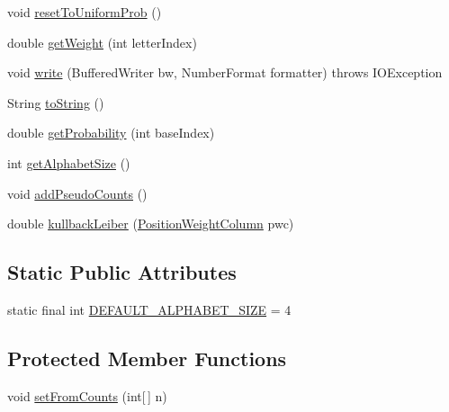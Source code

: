 \begin{DoxyCompactItemize}
void \hyperlink{classbroad_1_1core_1_1motif_1_1_position_weight_column_a526ed9055573827b2ccff975140a362f}{reset\+To\+Uniform\+Prob} ()
\item 
double \hyperlink{classbroad_1_1core_1_1motif_1_1_position_weight_column_a11cdf460bc71b967f82f8beff5425ee1}{get\+Weight} (int letter\+Index)
\item 
void \hyperlink{classbroad_1_1core_1_1motif_1_1_position_weight_column_ab4c32a7c518a414824ead8566a550762}{write} (Buffered\+Writer bw, Number\+Format formatter)  throws I\+O\+Exception 
\item 
String \hyperlink{classbroad_1_1core_1_1motif_1_1_position_weight_column_a5fd84a54189f40058feb2c570a427fd9}{to\+String} ()
\item 
double \hyperlink{classbroad_1_1core_1_1motif_1_1_position_weight_column_a1018f31a29569c2ecf2350c363bd2c75}{get\+Probability} (int base\+Index)
\item 
int \hyperlink{classbroad_1_1core_1_1motif_1_1_position_weight_column_a629eb4fe6442a462bc5b5c7352576364}{get\+Alphabet\+Size} ()
\item 
void \hyperlink{classbroad_1_1core_1_1motif_1_1_position_weight_column_ace1830010f357d09410350f2676d9f38}{add\+Pseudo\+Counts} ()
\item 
double \hyperlink{classbroad_1_1core_1_1motif_1_1_position_weight_column_a5591c51cf8e638045e2a3694bc06b10c}{kullback\+Leiber} (\hyperlink{classbroad_1_1core_1_1motif_1_1_position_weight_column}{Position\+Weight\+Column} pwc)
\end{DoxyCompactItemize}
\subsection*{Static Public Attributes}
\begin{DoxyCompactItemize}
\item 
static final int \hyperlink{classbroad_1_1core_1_1motif_1_1_position_weight_column_a62a73e5a7bf13dd6eed61c92f841a822}{D\+E\+F\+A\+U\+L\+T\+\_\+\+A\+L\+P\+H\+A\+B\+E\+T\+\_\+\+S\+I\+Z\+E} = 4
\end{DoxyCompactItemize}
\subsection*{Protected Member Functions}
\begin{DoxyCompactItemize}
\item 
void \hyperlink{classbroad_1_1core_1_1motif_1_1_position_weight_column_aa264b4ccb3a80288204ac503d629cda3}{set\+From\+Counts} (int\mbox{[}$\,$\mbox{]} n)
\end{DoxyCompactItemize}


